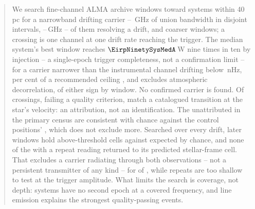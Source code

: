 \begin{abstract}
We search \NWinA{} fine-channel ALMA archive windows toward \NSysClassA{}
systems within 40\,pc for a narrowband drifting carrier -- \CvUnionA\,GHz of
union bandwidth in \CovNIslands{} disjoint intervals,
\DomAFreqLo--\DomAFreqHi\,GHz -- \EdrNWinA{} of them resolving a drift, and
\NWinB{} coarser windows; a crossing is one channel at one drift rate
reaching the trigger.
The median system's best window reaches $\EirpNinetySysMedA$\,W nine times
in ten by injection -- a single-epoch trigger completeness, not a
confirmation limit -- for a carrier narrower than the instrumental channel
drifting below \DriftCeilLo\,nHz, \AccelSheikhPct{} per cent of a
recommended ceiling \citep{Sheikh2019}, and excludes atmospheric
decorrelation, of either sign by window.
No confirmed carrier is found. Of \EvNCrossRaw{} crossings,
\PrFlagXrossWord{} failing a quality criterion, \MkAttr{} match a catalogued
transition at the star's velocity: an attribution, not an identification.
The \CeObs{} unattributed in the primary census are consistent with chance
against the control positions' \CeExp, which does not exclude \CeAddLim{}
more.
Searched over every drift, \WdNExc{} later windows hold above-threshold
cells against \WdExpect{} expected by chance, and none of the \RcNExclPoss{}
with a repeat reading returned to its predicted stellar-frame cell. That
excludes a carrier radiating through both observations -- not a persistent
transmitter of any kind -- for \HjNPowerHi{} of \RcNExcl{}, while
\HjNPowerLo{} repeats are too shallow to test at the trigger amplitude.
What limits the search is coverage, not depth: \ZcNoRepSys{} systems have no
second epoch at a covered frequency, and line emission explains the
strongest quality-passing events.
\end{abstract}


